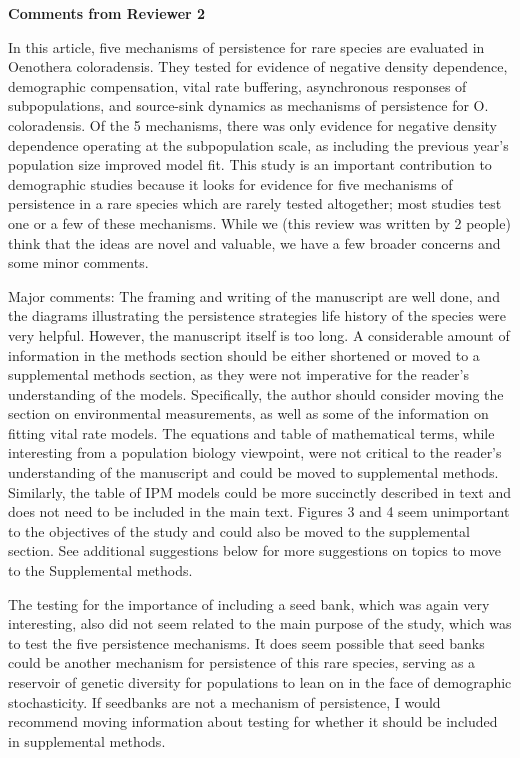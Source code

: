 \documentclass[12pt, letterpaper]{article}
\begin{document}
\textbf{Comments from Reviewer 2}

In this article, five mechanisms of persistence for rare species are evaluated in Oenothera coloradensis. They tested for evidence of negative density dependence, demographic compensation, vital rate buffering, asynchronous responses of subpopulations, and source-sink dynamics as mechanisms of persistence for O. coloradensis. Of the 5 mechanisms, there was only evidence for negative density dependence operating at the subpopulation scale, as including the previous year’s population size improved model fit. This study is an important contribution to demographic studies because it looks for evidence for five mechanisms of persistence in a rare species which are rarely tested altogether; most studies test one or a few of these mechanisms. While we (this review was written by 2 people) think that the ideas are novel and valuable, we have a few broader concerns and some minor comments.

Major comments:
The framing and writing of the manuscript are well done, and the diagrams illustrating the persistence strategies life history of the species were very helpful. However, the manuscript itself is too long. A considerable amount of information in the methods section should be either shortened or moved to a supplemental methods section, as they were not imperative for the reader’s understanding of the models. Specifically, the author should consider moving the section on environmental measurements, as well as some of the information on fitting vital rate models. The equations and table of mathematical terms, while interesting from a population biology viewpoint, were not critical to the reader’s understanding of the manuscript and could be moved to supplemental methods. Similarly, the table of IPM models could be more succinctly described in text and does not need to be included in the main text. Figures 3 and 4 seem unimportant to the objectives of the study and could also be moved to the supplemental section. See additional suggestions below for more suggestions on topics to move to the Supplemental methods.

The testing for the importance of including a seed bank, which was again very interesting, also did not seem related to the main purpose of the study, which was to test the five persistence mechanisms. It does seem possible that seed banks could be another mechanism for persistence of this rare species, serving as a reservoir of genetic diversity for populations to lean on in the face of demographic stochasticity. If seedbanks are not a mechanism of persistence, I would recommend moving information about testing for whether it should be included in supplemental methods.
\end{document}

